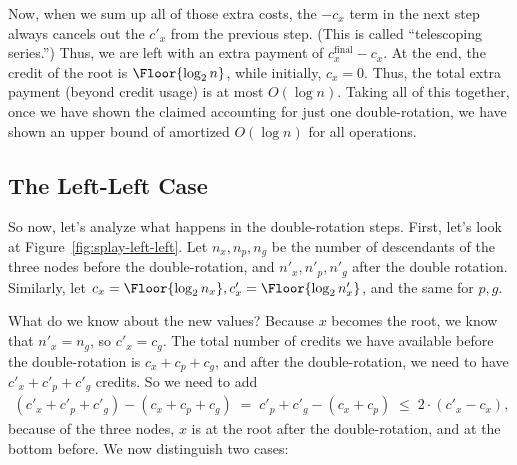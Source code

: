 Now, when we sum up all of those extra costs, the $-c_x$ term in the
next step always cancels out the $c'_x$ from the previous step. (This
is called  ``telescoping series.'')
Thus, we are left with an extra payment of $c^{\text{final}}_x - c_x$.
At the end, the credit of the root is $\Floor{\log_2 n}$, while initially,
$c_x = 0$. Thus, the total extra payment (beyond credit usage) is at
most $O (\log n)$. Taking all of this together, once we have shown the
claimed accounting for just one double-rotation, we have shown an
upper bound of amortized $O(\log n)$ for all operations.

\subsection{The Left-Left Case}
So now, let's analyze what happens in the double-rotation steps. 
First, let's look at Figure~\ref{fig:splay-left-left}. 
Let $n_x, n_p, n_g$ be the number of descendants of the three nodes
before the double-rotation, and $n'_x, n'_p, n'_g$ after the double
rotation. 
Similarly, let $c_x = \Floor{\log_2 n_x}, c'_x = \Floor{\log_2 n'_x}$,
and the same for $p,g$.

What do we know about the new values?
Because $x$ becomes the root, we know that $n'_x = n_g$, so $c'_x = c_g$. 
The total number of credits we have available before the
double-rotation is 
$c_x + c_p + c_g$, and after the double-rotation, we need to have
$c'_x + c'_p + c'_g$ credits.
So we need to add
\begin{align}
(c'_x + c'_p + c'_g) - (c_x + c_p + c_g)
\; = \; c'_p + c'_g - (c_x + c_p)
\; \leq \; 2 \cdot (c'_x - c_x), \label{eqn:splay:basic-credit}
\end{align}
because of the three nodes, $x$ is at the root after the
double-rotation, and at the bottom before.
We now distinguish two cases:

